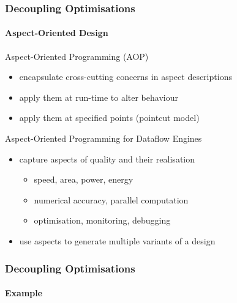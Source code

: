 \begin{frame}[fragile]
  \frametitle{Decoupling Optimisations}
  \framesubtitle{Aspect-Oriented Design}
  \begin{beamerboxesrounded}{Aspect-Oriented Programming (AOP)}
    \begin{itemize}
      \item encapsulate cross-cutting concerns in aspect descriptions
      \item apply them at run-time to alter behaviour
      \item apply them at specified points (pointcut model)
    \end{itemize}
  \end{beamerboxesrounded}
  \vspace{0.75cm}
  \begin{beamerboxesrounded}{Aspect-Oriented Programming for Dataflow Engines}
    \begin{itemize}
      \item capture aspects of quality and their realisation
        \begin{itemize}
          \item speed, area, power, energy
          \item numerical accuracy, parallel computation
          \item optimisation, monitoring, debugging
        \end{itemize}
      \item use aspects to generate multiple variants of a design
    \end{itemize}
  \end{beamerboxesrounded}


\end{frame}

\begin{frame}[fragile]
  \frametitle{Decoupling Optimisations}
  \framesubtitle{Example}
  \begin{figure}[!ht]
  \centering
  \def\svgwidth{\textwidth}
  
\end{figure}
\end{frame}
